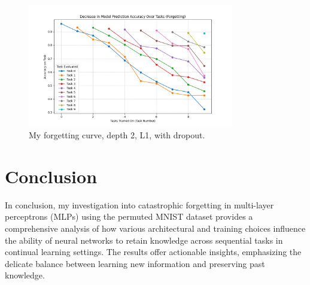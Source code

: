 \documentclass{article}
\begin{document}
\begin{figure}[H]
\centering
\includegraphics[width=0.8\textwidth]{results/depth_2__reg_L1__optimizer_sgd__dropout_True/forgetting_mlp_depth2_regL1_dropoutTrue.png}
\caption{My forgetting curve, depth 2, L1, with dropout.}
\label{fig:with_dropout}
\end{figure}

\section{Conclusion}
In conclusion, my investigation into catastrophic forgetting in multi-layer perceptrons (MLPs) using the permuted MNIST dataset provides a comprehensive analysis of how various architectural and training choices influence the ability of neural networks to retain knowledge across sequential tasks in continual learning settings. The results offer actionable insights, emphasizing the delicate balance between learning new information and preserving past knowledge.
\end{document}
